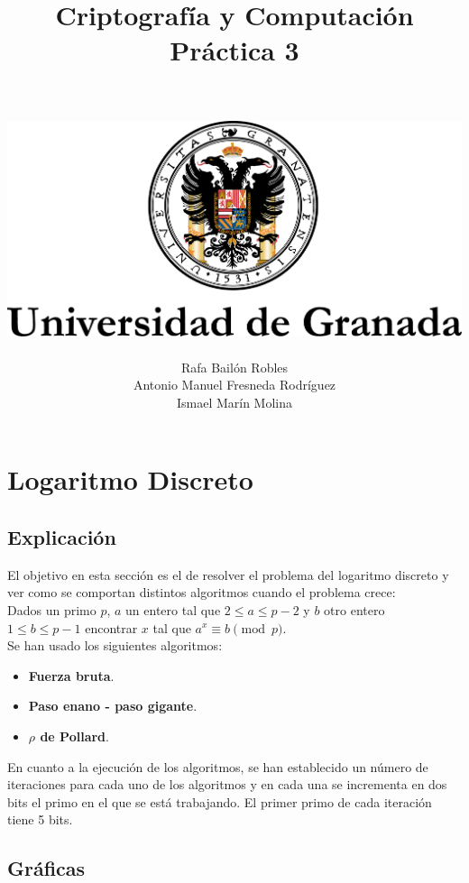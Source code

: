 \documentclass[12pt,spanish]{article}
\author{
	\\\\
	\includegraphics[scale=1]{UGR} \\
	\linebreak\\
	\Large Rafa Bailón Robles\\
	\Large Antonio Manuel Fresneda Rodríguez\\
	\Large Ismael Marín Molina\\
}
\title{\huge \textbf{Criptografía y Computación\\ Práctica 3}}
\begin{document}
	\maketitle
    \pagebreak
    \tableofcontents
    \pagebreak
 	
 	\section{Logaritmo Discreto}
 	
		\subsection{Explicación}
	 	
El objetivo en esta sección es el de resolver el problema del logaritmo discreto y ver como se comportan distintos algoritmos cuando el problema crece:
\\
Dados un primo $p$, $a$ un entero tal que $2 \leq a \leq p-2$ y $b$ otro entero $1 \leq b \leq p-1$ encontrar $x$ tal que $a^{x} \equiv b \pmod{p}$.
\\
Se han usado los siguientes algoritmos: 
\begin{itemize}
	\item\textbf{Fuerza bruta}.
	\item\textbf{Paso enano - paso gigante}.
	\item\textbf{\boldmath $\rho$ de Pollard}.
\end{itemize}
En cuanto a la ejecución de los algoritmos, se han establecido un número de iteraciones para cada uno de los algoritmos y en cada una se incrementa en dos bits el primo en el que se está trabajando. El primer primo de cada iteración tiene 5 bits.
		
		\pagebreak

		\subsection{Gráficas}
\end{document}
